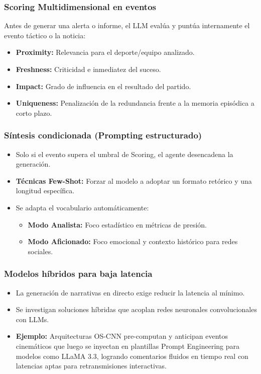 \documentclass[aspectratio=169]{beamer}
\begin{document}
\begin{frame}\frametitle{Scoring Multidimensional en eventos}
Antes de generar una alerta o informe, el LLM evalúa y puntúa internamente el evento táctico o la noticia:
\begin{itemize}
    \item \textbf{Proximity:} Relevancia para el deporte/equipo analizado.
    \item \textbf{Freshness:} Criticidad e inmediatez del suceso.
    \item \textbf{Impact:} Grado de influencia en el resultado del partido.
    \item \textbf{Uniqueness:} Penalización de la redundancia frente a la memoria episódica a corto plazo.
\end{itemize}
\end{frame}

\begin{frame}\frametitle{Síntesis condicionada (Prompting estructurado)}
\begin{itemize}
    \item Solo si el evento supera el umbral de Scoring, el agente desencadena la generación.
    \item \textbf{Técnicas Few-Shot:} Forzar al modelo a adoptar un formato retórico y una longitud específica.
    \item Se adapta el vocabulario automáticamente:
    \begin{itemize}
        \item \textbf{Modo Analista:} Foco estadístico en métricas de presión.
        \item \textbf{Modo Aficionado:} Foco emocional y contexto histórico para redes sociales.
    \end{itemize}
\end{itemize}
\end{frame}

\begin{frame}\frametitle{Modelos híbridos para baja latencia}
\begin{itemize}
    \item La generación de narrativas en directo exige reducir la latencia al mínimo.
    \item Se investigan soluciones híbridas que acoplan redes neuronales convolucionales con LLMs.
    \item \textbf{Ejemplo:} Arquitecturas OS-CNN pre-computan y anticipan eventos cinemáticos que luego se inyectan en plantillas Prompt Engineering para modelos como LLaMA 3.3, logrando comentarios fluidos en tiempo real con latencias aptas para retransmisiones interactivas.
\end{itemize}
\end{frame}
\end{document}
